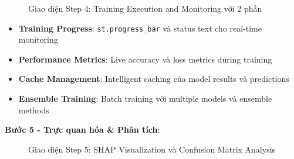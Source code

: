 \begin{figure}[H]
    \centering
{}
\quad
{}
\caption{Giao diện Step 4: Training Execution and Monitoring với 2 phần}
\label{fig:wizard_step4_real}
\end{figure}

\begin{itemize}
    \item \textbf{Training Progress}: \texttt{st.progress\_bar} và status text cho real-time monitoring
    \item \textbf{Performance Metrics}: Live accuracy và loss metrics during training
    \item \textbf{Cache Management}: Intelligent caching của model results và predictions
    \item \textbf{Ensemble Training}: Batch training với multiple models và ensemble methods
\end{itemize}

\textbf{Bước 5 - Trực quan hóa \& Phân tích}:

\begin{figure}[H]
\centering
{}
\quad
{}
\caption{Giao diện Step 5: SHAP Visualization và Confusion Matrix Analysis}
\label{fig:wizard_step5_real_1_2}
\end{figure}

